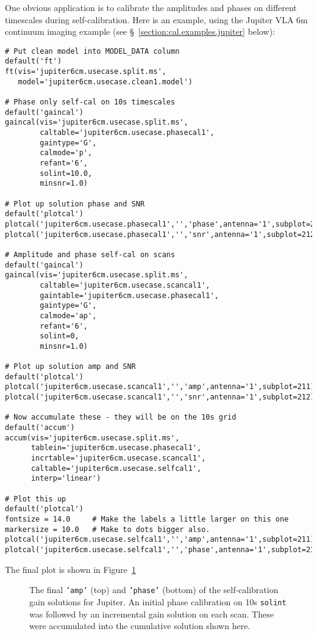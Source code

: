 One obvious application is to calibrate the amplitudes and phases
on different timescales during self-calibration.
Here is an example, using the Jupiter VLA 6m continuum imaging 
example (see \S~\ref{section:cal.examples.jupiter} below):
\small
\begin{verbatim}
# Put clean model into MODEL_DATA column
default('ft')
ft(vis='jupiter6cm.usecase.split.ms',
   model='jupiter6cm.usecase.clean1.model')

# Phase only self-cal on 10s timescales
default('gaincal')
gaincal(vis='jupiter6cm.usecase.split.ms',
        caltable='jupiter6cm.usecase.phasecal1',
        gaintype='G',
        calmode='p',
        refant='6',
        solint=10.0,
        minsnr=1.0)

# Plot up solution phase and SNR
default('plotcal')
plotcal('jupiter6cm.usecase.phasecal1','','phase',antenna='1',subplot=211)
plotcal('jupiter6cm.usecase.phasecal1','','snr',antenna='1',subplot=212)

# Amplitude and phase self-cal on scans
default('gaincal')
gaincal(vis='jupiter6cm.usecase.split.ms',
        caltable='jupiter6cm.usecase.scancal1',
        gaintable='jupiter6cm.usecase.phasecal1',
        gaintype='G',
        calmode='ap',
        refant='6',
        solint=0,
        minsnr=1.0)

# Plot up solution amp and SNR
default('plotcal')
plotcal('jupiter6cm.usecase.scancal1','','amp',antenna='1',subplot=211)
plotcal('jupiter6cm.usecase.scancal1','','snr',antenna='1',subplot=212)

# Now accumulate these - they will be on the 10s grid
default('accum')
accum(vis='jupiter6cm.usecase.split.ms',
      tablein='jupiter6cm.usecase.phasecal1',
      incrtable='jupiter6cm.usecase.scancal1',
      caltable='jupiter6cm.usecase.selfcal1',
      interp='linear')

# Plot this up
default('plotcal')
fontsize = 14.0     # Make the labels a little larger on this one
markersize = 10.0   # Make to dots bigger also.
plotcal('jupiter6cm.usecase.selfcal1','','amp',antenna='1',subplot=211)
plotcal('jupiter6cm.usecase.selfcal1','','phase',antenna='1',subplot=212)
\end{verbatim}
\normalsize
The final plot is shown in Figure~\ref{fig:accum_jupiter}

\begin{figure}[h!]
\begin{center}
\caption{\label{fig:accum_jupiter} The final {\tt 'amp'} (top) and
{\tt 'phase'} (bottom) of the self-calibration gain solutions
for Jupiter.  An initial phase calibration on 10s {\tt solint} was
followed by an incremental gain solution on each scan.  These
were accumulated into the cumulative solution shown here.
}
\hrulefill
\end{center}
\end{figure}


